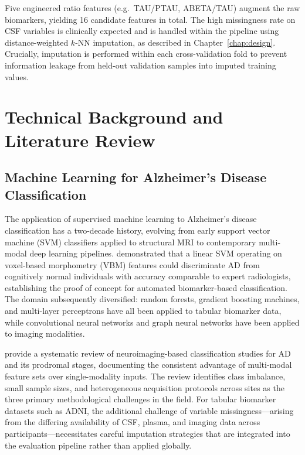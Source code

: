 \documentclass[12pt, a4paper]{report}
\begin{document}
  Five engineered ratio features (e.g.\ TAU/PTAU, ABETA/TAU) augment the raw
  biomarkers, yielding 16 candidate features in total. The high missingness rate on
  CSF variables is clinically expected and is handled within the pipeline using
  distance-weighted $k$-NN imputation, as described in Chapter~\ref{chap:design}.
  Crucially, imputation is performed within each cross-validation fold to prevent
  information leakage from held-out validation samples into imputed training values.


  \chapter{Technical Background and Literature Review}
  \label{chap:litreview}

  \section{Machine Learning for Alzheimer's Disease Classification}
  \label{sec:ml-ad}

  The application of supervised machine learning to Alzheimer's disease classification
  has a two-decade history, evolving from early support vector machine (SVM) classifiers
  applied to structural MRI to contemporary multi-modal deep learning pipelines.
  \citet{kloppel2008automatic} demonstrated that a linear SVM operating on voxel-based
  morphometry (VBM) features could discriminate AD from cognitively normal individuals
  with accuracy comparable to expert radiologists, establishing the proof of concept
  for automated biomarker-based classification. The domain subsequently diversified:
  random forests, gradient boosting machines, and multi-layer perceptrons have all
  been applied to tabular biomarker data, while convolutional neural networks and
  graph neural networks have been applied to imaging modalities.

  \citet{rathore2017review} provide a systematic review of neuroimaging-based
  classification studies for AD and its prodromal stages, documenting the consistent
  advantage of multi-modal feature sets over single-modality inputs. The review
  identifies class imbalance, small sample sizes, and heterogeneous acquisition
  protocols across sites as the three primary methodological challenges in the field.
  For tabular biomarker datasets such as ADNI, the additional challenge of variable
  missingness---arising from the differing availability of CSF, plasma, and imaging
  data across participants---necessitates careful imputation strategies that are
  integrated into the evaluation pipeline rather than applied globally.
\end{document}
